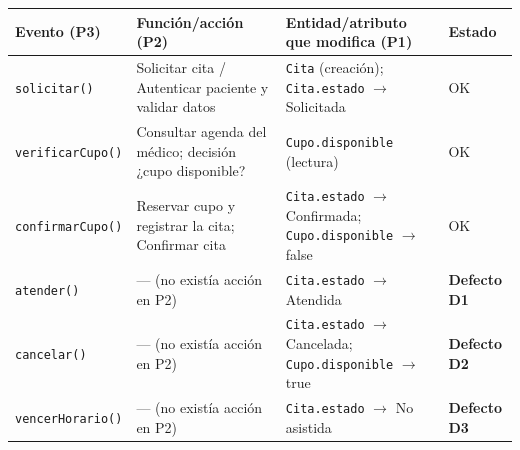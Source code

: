 \documentclass[11pt,a4paper,oneside]{article}
\begin{document}
	{\footnotesize
		\begin{center}
			\begin{tabularx}{\textwidth}{|L{2.9cm}|L{4.3cm}|Y|C{1.5cm}|}
				\hline
				\textbf{Evento (P3)} & \textbf{Función/acción (P2)} & \textbf{Entidad/atributo que modifica (P1)} & \textbf{Estado} \\ \hline
				\texttt{solicitar()} & Solicitar cita / Autenticar paciente y validar datos & \texttt{Cita} (creación); \texttt{Cita.estado} $\rightarrow$ Solicitada & OK \\ \hline
				\texttt{verificarCupo()} & Consultar agenda del médico; decisión ¿cupo disponible? & \texttt{Cupo.disponible} (lectura) & OK \\ \hline
				\texttt{confirmarCupo()} & Reservar cupo y registrar la cita; Confirmar cita & \texttt{Cita.estado} $\rightarrow$ Confirmada; \texttt{Cupo.disponible} $\rightarrow$ false & OK \\ \hline
				\texttt{atender()} & --- (no existía acción en P2) & \texttt{Cita.estado} $\rightarrow$ Atendida & \textbf{Defecto D1} \\ \hline
				\texttt{cancelar()} & --- (no existía acción en P2) & \texttt{Cita.estado} $\rightarrow$ Cancelada; \texttt{Cupo.disponible} $\rightarrow$ true & \textbf{Defecto D2} \\ \hline
				\texttt{vencerHorario()} & --- (no existía acción en P2) & \texttt{Cita.estado} $\rightarrow$ No asistida & \textbf{Defecto D3} \\ \hline
			\end{tabularx}
	\end{center}}

    \newpage
	
	\vspace{4pt}
	
\end{document}
